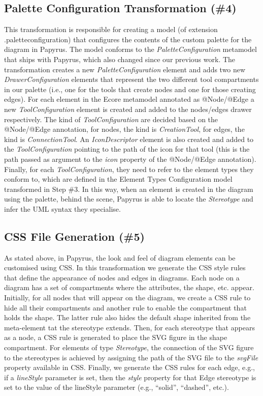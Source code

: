 \subsection{Palette Configuration Transformation (\#4)}
\label{sec:paletteGeneration}
This transformation is responsible for creating a model (of extension .paletteconfiguration) that configures the contents of the custom palette for the diagram in Papyrus. 
The model conforms to the \textit{PaletteConfiguration} metamodel that ships with Papyrus, which also changed since our previous work. 
The transformation creates a new \textit{PaletteConfiguration} element and adds two new \textit{DrawerConfiguration} elements that represent the two different tool compartments in our palette (i.e., one for the tools that create nodes and one for those creating edges). 
For each element in the Ecore metamodel annotated as @Node/@Edge a new \textit{ToolConfiguration} element is created and added to the nodes/edges drawer respectively. 
The kind of \textit{ToolConfiguration} are decided based on the @Node/@Edge annotation, for nodes, the kind is \textit{CreationTool}, for edges, the kind is \textit{ConnectionTool}.
An \textit{IconDescriptor} element is also created and added to the \textit{ToolConfiguration} pointing to the path of the icon for that tool (this is the path passed as argument to the \textit{icon} property of the @Node/@Edge annotation).
Finally, for each \textit{ToolConfiguration}, they need to refer to the element types they conform to, which are defined in the Element Types Configuration model transformed in Step \#3. 
In this way, when an element is created in the diagram using the palette, behind the scene, Papyrus is able to locate the \textit{Stereotype} and infer the UML syntax they specialise.

\subsection{CSS File Generation (\#5)}
\label{sec:cssGeneration}
As stated above, in Papyrus, the look and feel of diagram elements can be customised using CSS. 
In this transformation we generate the CSS style rules that define the appearance of nodes and edges in diagrams. 
Each node on a diagram has a set of compartments where the attributes, the shape, etc. appear. 
Initially, for all nodes that will appear on the diagram, we create a CSS rule to hide all their compartments and another rule to enable the compartment that holds the shape. 
The latter rule also hides the default shape inherited from the meta-element tat the stereotype extends. 
Then, for each stereotype that appears as a node, a CSS rule is generated to place the SVG figure in the shape compartment. 
For elements of type \textit{Stereotype}, the connection of the SVG figure to the stereotypes is achieved by assigning the path of the SVG file to the \textit{svgFile} property available in CSS. 
Finally, we generate the CSS rules for each edge, e.g., if a \emph{lineStyle} parameter is set, then the \textit{style} property for that Edge stereotype is set to the value of the lineStyle parameter (e.g., ``solid'', ``dashed'', etc.).

